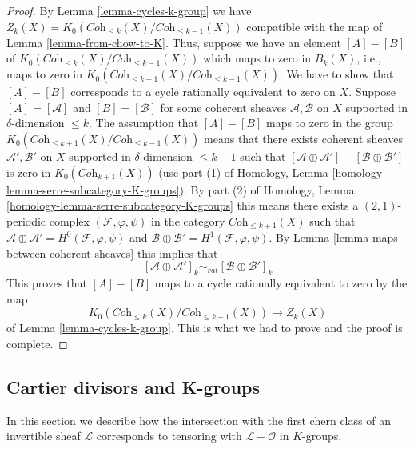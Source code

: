 \begin{proof}
By Lemma \ref{lemma-cycles-k-group} we have
$Z_k(X) = K_0(\textit{Coh}_{\leq k}(X)/\textit{Coh}_{\leq k - 1}(X))$
compatible with the map of Lemma \ref{lemma-from-chow-to-K}.
Thus, suppose we have an element $[A] - [B]$ of
$K_0(\textit{Coh}_{\leq k}(X)/\textit{Coh}_{\leq k - 1}(X))$
which maps to zero in $B_k(X)$, i.e., maps to zero in
$K_0(\textit{Coh}_{\leq k + 1}(X)/\textit{Coh}_{\leq k - 1}(X))$.
We have to show that $[A] - [B]$ corresponds to a cycle
rationally equivalent to zero on $X$.
Suppose $[A] = [\mathcal{A}]$ and $[B] = [\mathcal{B}]$
for some coherent sheaves $\mathcal{A}, \mathcal{B}$ on
$X$ supported in $\delta$-dimension $\leq k$.
The assumption that $[A] - [B]$ maps to zero in the group
$K_0(\textit{Coh}_{\leq k + 1}(X)/\textit{Coh}_{\leq k - 1}(X))$
means that there exists coherent sheaves
$\mathcal{A}', \mathcal{B}'$ on $X$ supported in
$\delta$-dimension $\leq k - 1$ such that
$[\mathcal{A} \oplus \mathcal{A}'] - [\mathcal{B} \oplus \mathcal{B}']$
is zero in $K_0(\textit{Coh}_{k + 1}(X))$ (use part (1) of
Homology, Lemma \ref{homology-lemma-serre-subcategory-K-groups}).
By part (2) of
Homology, Lemma \ref{homology-lemma-serre-subcategory-K-groups}
this means there exists a $(2, 1)$-periodic complex
$(\mathcal{F}, \varphi, \psi)$ in the category $\textit{Coh}_{\leq k + 1}(X)$
such that
$\mathcal{A} \oplus \mathcal{A}' = H^0(\mathcal{F}, \varphi, \psi)$
and $\mathcal{B} \oplus \mathcal{B}' = H^1(\mathcal{F}, \varphi, \psi)$.
By Lemma \ref{lemma-maps-between-coherent-sheaves}
this implies that
$$
[\mathcal{A} \oplus \mathcal{A}']_k
\sim_{rat}
[\mathcal{B} \oplus \mathcal{B}']_k
$$
This proves that $[A] - [B]$ maps to a cycle rationally
equivalent to zero by the map
$$
K_0(\textit{Coh}_{\leq k}(X)/\textit{Coh}_{\leq k - 1}(X))
\longrightarrow Z_k(X)
$$
of Lemma \ref{lemma-cycles-k-group}. This is what we
had to prove and the proof is complete.
\end{proof}














\subsection{Cartier divisors and K-groups}
\label{subsection-cartier-coherent}

\noindent
In this section we describe how the intersection with the
first chern class of an invertible sheaf $\mathcal{L}$
corresponds to tensoring with $\mathcal{L} - \mathcal{O}$
in $K$-groups.

